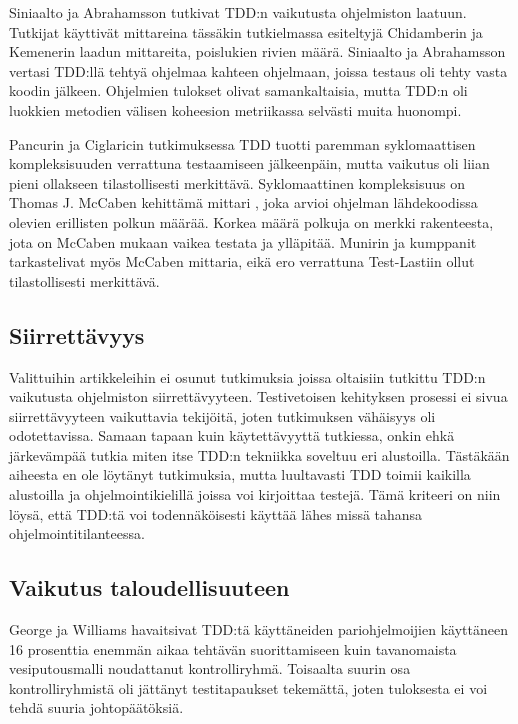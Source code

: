 \documentclass[finnish]{tktltiki2}
\theoremstyle{definition}
\theoremstyle{remark}
\begin{document}
Siniaalto ja Abrahamsson \cite{Siniaalto07} tutkivat TDD:n vaikutusta ohjelmiston laatuun. Tutkijat käyttivät mittareina tässäkin tutkielmassa esiteltyjä Chidamberin ja Kemenerin laadun mittareita, poislukien rivien määrä. Siniaalto ja Abrahamsson vertasi TDD:llä tehtyä ohjelmaa kahteen ohjelmaan, joissa testaus oli tehty vasta koodin jälkeen. Ohjelmien tulokset olivat samankaltaisia, mutta TDD:n oli luokkien metodien välisen koheesion metriikassa selvästi muita huonompi. 

Pancurin ja Ciglaricin tutkimuksessa \cite{Pancur11} TDD tuotti paremman syklomaattisen kompleksisuuden verrattuna testaamiseen jälkeenpäin, mutta vaikutus oli liian pieni ollakseen tilastollisesti merkittävä. Syklomaattinen kompleksisuus on Thomas J. McCaben kehittämä mittari \cite{McCabe76}, joka arvioi ohjelman lähdekoodissa olevien erillisten polkun määrää. Korkea määrä polkuja on merkki rakenteesta, jota on McCaben mukaan vaikea testata ja ylläpitää. Munirin ja kumppanit \cite{Munir14} tarkastelivat myös McCaben mittaria, eikä ero verrattuna Test-Lastiin ollut tilastollisesti merkittävä.

\subsection{Siirrettävyys}

Valittuihin artikkeleihin ei osunut tutkimuksia joissa oltaisiin tutkittu TDD:n vaikutusta ohjelmiston siirrettävyyteen. Testivetoisen kehityksen prosessi ei sivua siirrettävyyteen vaikuttavia tekijöitä, joten tutkimuksen vähäisyys oli odotettavissa.
Samaan tapaan kuin käytettävyyttä tutkiessa, onkin ehkä järkevämpää tutkia miten itse TDD:n tekniikka soveltuu eri alustoilla. Tästäkään aiheesta en ole löytänyt tutkimuksia, mutta luultavasti TDD toimii kaikilla alustoilla ja ohjelmointikielillä joissa voi kirjoittaa testejä. Tämä kriteeri on niin löysä, että TDD:tä voi todennäköisesti käyttää lähes missä tahansa ohjelmointitilanteessa.



\subsection{Vaikutus taloudellisuuteen}

George ja Williams \cite{George04} havaitsivat TDD:tä käyttäneiden pariohjelmoijien käyttäneen 16 prosenttia enemmän aikaa tehtävän suorittamiseen kuin tavanomaista vesiputousmalli noudattanut kontrolliryhmä. Toisaalta suurin osa kontrolliryhmistä oli jättänyt testitapaukset tekemättä, joten tuloksesta ei voi tehdä suuria johtopäätöksiä.
\end{document}
